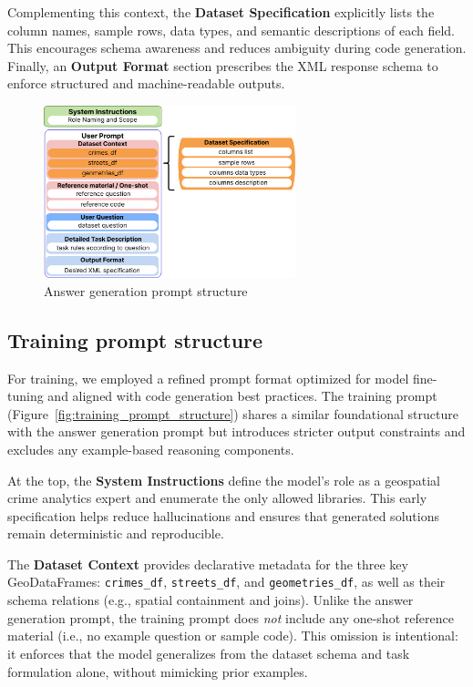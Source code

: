 Complementing this context, the \textbf{Dataset Specification} explicitly lists the column names, sample rows, data types, and semantic descriptions of each field. This encourages schema awareness and reduces ambiguity during code generation. Finally, an \textbf{Output Format} section prescribes the XML response schema to enforce structured and machine-readable outputs.

\begin{figure}[hbtp]
  \centering
  \includegraphics[width=0.65\textwidth]{images/answer_gen.png}
  \caption{Answer generation prompt structure}
  \label{fig:answer_generation_prompt_structure}
\end{figure}


\subsection{Training prompt structure}

For training, we employed a refined prompt format optimized for model fine-tuning and aligned with code generation best practices. The training prompt (Figure~\ref{fig:training_prompt_structure}) shares a similar foundational structure with the answer generation prompt but introduces stricter output constraints and excludes any example-based reasoning components.

At the top, the \textbf{System Instructions} define the model’s role as a geospatial crime analytics expert and enumerate the only allowed libraries. This early specification helps reduce hallucinations and ensures that generated solutions remain deterministic and reproducible.

The \textbf{Dataset Context} provides declarative metadata for the three key GeoDataFrames: \texttt{crimes\_df}, \texttt{streets\_df}, and \texttt{geometries\_df}, as well as their schema relations (e.g., spatial containment and joins). Unlike the answer generation prompt, the training prompt does \emph{not} include any one-shot reference material (i.e., no example question or sample code). This omission is intentional: it enforces that the model generalizes from the dataset schema and task formulation alone, without mimicking prior examples.

